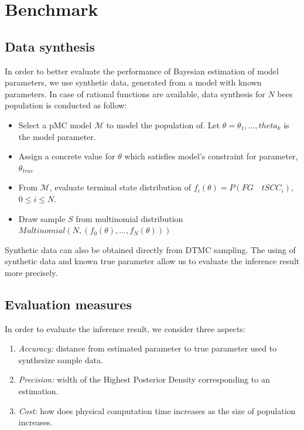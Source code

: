\documentclass[12pt]{article}
\theoremstyle{definition}
\begin{document}
\section{Benchmark}
\subsection{Data synthesis}
In order to better evaluate the performance of Bayesian estimation of model
parameters, we use synthetic data, generated from a model with known parameters.
In case of rational functions are available, data synthesis for $N$ bees
population is conducted as follow:
\begin{itemize}
\item Select a pMC model $\mathcal{M}$ to model the population of. Let
  $\theta=\theta_1,\ldots,theta_k$ is the model parameter.
\item Assign a concrete value for $\theta$ which satisfies model's constraint
  for parameter, $\theta_{true}$
\item From $\mathcal{M}$, evaluate terminal state distribution of $f_i(\theta) =
  P(FG\quad tSCC_i)$, $0 \leq i \leq N$.
\item Draw sample $S$ from multinomial distribution $Multinomial(N,
  (f_0(\theta),\ldots,f_N(\theta)))$
\end{itemize}
Synthetic data can also be obtained directly from DTMC sampling. The using of
synthetic data and known true parameter allow us to evaluate the inference
result more precisely.

\subsection{Evaluation measures}
In order to evaluate the inference result, we consider three aspects:
\begin{enumerate}
\item \textit{Accuracy:} distance from estimated parameter to true parameter
  used to synthesize sample data.
\item \textit{Precision:} width of the Highest Posterior Density corresponding
  to an estimation.
\item \textit{Cost:} how does physical computation time increases as the size of
  population increases.
\end{enumerate}
\end{document}
